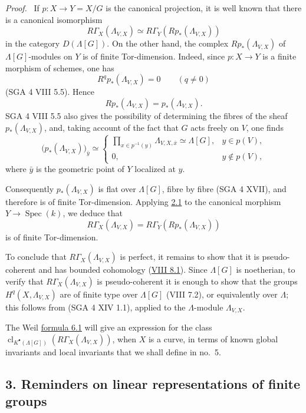 \documentclass[11pt]{article}
\newenvironment{prooftext}[1][Proof]{\par\noindent\emph{#1.}\ }{\par\medskip}
\DeclareMathOperator{\Spec}{Spec}
\providecommand{\Spec}{\operatorname{Spec}}
\providecommand{\Spec}{\operatorname{Spec}}
\providecommand{\Spec}{\operatorname{Spec}}
\providecommand{\Spec}{\operatorname{Spec}}
\begin{document}
\begin{prooftext}
If $p:X\to Y=X/G$ is the canonical projection, it is well known that there is a canonical isomorphism
\[
R\Gamma_X(\Lambda_{V,X})\simeq R\Gamma_Y(Rp_*(\Lambda_{V,X}))
\]
in the category $D(\Lambda[G])$. On the other hand, the complex $Rp_*(\Lambda_{V,X})$ of $\Lambda[G]$-modules on $Y$ is of finite Tor-dimension. Indeed, since $p:X\to Y$ is a finite morphism of schemes, one has
\[
R^q p_*(\Lambda_{V,X})=0\qquad(q\ne0)
\]
(SGA 4 VIII 5.5). Hence
\[
Rp_*(\Lambda_{V,X})=p_*(\Lambda_{V,X}).
\]
SGA 4 VIII 5.5 also gives the possibility of determining the fibres of the sheaf $p_*(\Lambda_{V,X})$, and, taking account of the fact that $G$ acts freely on $V$, one finds
\[
\bigl(p_*(\Lambda_{V,X})\bigr)_{\bar y}\simeq
\begin{cases}
\displaystyle \prod_{x\in p^{-1}(y)}\Lambda_{V,X,\bar x}\simeq \Lambda[G],& y\in p(V),\\[1em]
0,& y\notin p(V),
\end{cases}
\]
where $\bar y$ is the geometric point of $Y$ localized at $y$.

Consequently $p_*(\Lambda_{V,X})$ is flat over $\Lambda[G]$, fibre by fibre (SGA 4 XVII), and therefore is of finite Tor-dimension. Applying \hyperref[sga5:X:lemma:2.1]{2.1} to the canonical morphism $Y\to\Spec(k)$, we deduce that
\[
R\Gamma_X(\Lambda_{V,X})=R\Gamma_Y(Rp_*(\Lambda_{V,X}))
\]
is of finite Tor-dimension.

To conclude that $R\Gamma_X(\Lambda_{V,X})$ is perfect, it remains to show that it is pseudo-coherent and has bounded cohomology (\hyperref[sga5:VIII:proposition:8.1]{VIII 8.1}). Since $\Lambda[G]$ is noetherian, to verify that $R\Gamma_X(\Lambda_{V,X})$ is pseudo-coherent it is enough to show that the groups $H^q(X,\Lambda_{V,X})$ are of finite type over $\Lambda[G]$ (VIII 7.2), or equivalently over $\Lambda$; this follows from (SGA 4 XIV 1.1), applied to the $\Lambda$-module $\Lambda_{V,X}$.
\end{prooftext}

The Weil \hyperref[sga5:X:subsubsection:6.1]{formula 6.1} will give an expression for the class
$\operatorname{cl}_{K^\bullet(\Lambda[G])}(R\Gamma_X(\Lambda_{V,X}))$,
when $X$ is a curve, in terms of known global invariants and local invariants
that we shall define in no.~5.

\subsection*{3. Reminders on linear representations of finite groups}\label{sga5:X:subsection:3}
\end{document}
